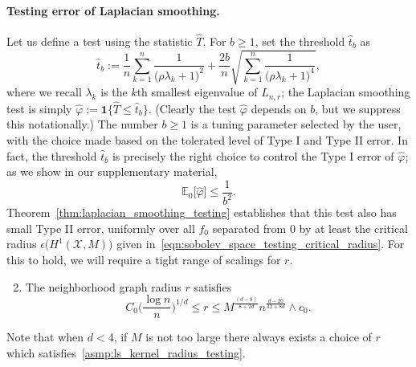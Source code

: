 \documentclass[twoside]{article}
\newcommand{\1}{\mathbf{1}}
\newcommand{\Lap}{L}
\newcommand{\Xset}{\mathcal{X}}
\newcommand{\Ebb}{\mathbb{E}}
\newcommand{\wh}[1]{\widehat{#1}}
\theoremstyle{definition}
\theoremstyle{remark}
\begin{document}
\paragraph{Testing error of Laplacian smoothing.}
Let us define a test using the statistic $\wh{T}$. For $b \geq 1$, set the threshold $\wh{t}_b$ as
\begin{equation*}
\wh{t}_{b} := \frac{1}{n}\sum_{k = 1}^{n} \frac{1}{\bigl(\rho \lambda_k + 1\bigr)^2} + \frac{2b}{n}\sqrt{\sum_{k = 1}^{n} \frac{1}{\bigl(\rho \lambda_k + 1\bigr)^4}},
\end{equation*}
where we recall $\lambda_k$ is the $k$th smallest eigenvalue of $\Lap_{n,r}$; the Laplacian smoothing test is simply $\wh{\varphi} := \1\bigl\{\wh{T} \leq \wh{t}_b\bigr\}$. (Clearly the test $\wh{\varphi}$ depends on $b$, but we suppress this notationally.) The number $b \geq 1$ is a tuning parameter selected by the user, with the choice made based on the tolerated level of Type I and Type II error. In fact, the threshold $\wh{t}_b$ is precisely the right choice to control the Type I error of $\wh{\varphi}$; as we show in our supplementary material,
\begin{equation}
\label{eqn:type_I_error}
\Ebb_0\bigl[\wh{\varphi}\bigr] \leq \frac{1}{b^2}.
\end{equation}
Theorem~\ref{thm:laplacian_smoothing_testing} establishes that this test also has small Type II error, uniformly over all $f_0$ separated from $0$ by at least the critical radius $\epsilon\bigl(H^1(\Xset,M)\bigr)$ given in~\eqref{eqn:sobolev_space_testing_critical_radius}. For this to hold, we will require a tight range of scalings for $r$.
\begin{enumerate}[label=(R\arabic*)]
	\setcounter{enumi}{1}
	\item 
	\label{asmp:ls_kernel_radius_testing}
	The neighborhood graph radius $r$ satisfies
	\begin{equation*}
	C_0\biggl(\frac{\log n}{n}\biggr)^{1/d} \leq r \leq M^{\frac{(d - 8)}{8 + 2d}}n^{\frac{d - 20}{32 + 8d}} \wedge c_0.
	\end{equation*}
\end{enumerate}
Note that when $d < 4$, if $M$ is not too large there always exists a choice of $r$ which satisfies~\ref{asmp:ls_kernel_radius_testing}.
\end{document}
